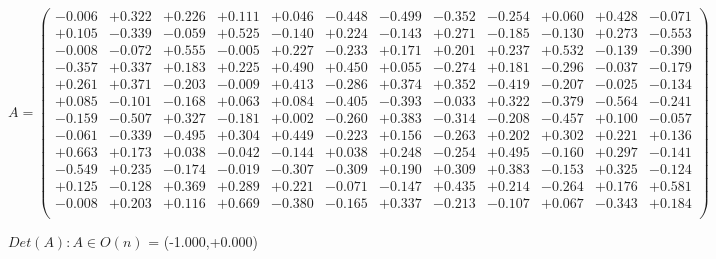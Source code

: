 \documentclass[9pt]{article}
\theoremstyle{plain}
\theoremstyle{definition}
\theoremstyle{remark}
\numberwithin{equation}{section}
\begin{document}
$A = \left(
\begin{array}{
cccccccccccc}
-0.006 & +0.322 & +0.226 & +0.111 & +0.046 & -0.448 & -0.499 & -0.352 & -0.254 & +0.060 & +0.428 & -0.071 \\
+0.105 & -0.339 & -0.059 & +0.525 & -0.140 & +0.224 & -0.143 & +0.271 & -0.185 & -0.130 & +0.273 & -0.553 \\
-0.008 & -0.072 & +0.555 & -0.005 & +0.227 & -0.233 & +0.171 & +0.201 & +0.237 & +0.532 & -0.139 & -0.390 \\
-0.357 & +0.337 & +0.183 & +0.225 & +0.490 & +0.450 & +0.055 & -0.274 & +0.181 & -0.296 & -0.037 & -0.179 \\
+0.261 & +0.371 & -0.203 & -0.009 & +0.413 & -0.286 & +0.374 & +0.352 & -0.419 & -0.207 & -0.025 & -0.134 \\
+0.085 & -0.101 & -0.168 & +0.063 & +0.084 & -0.405 & -0.393 & -0.033 & +0.322 & -0.379 & -0.564 & -0.241 \\
-0.159 & -0.507 & +0.327 & -0.181 & +0.002 & -0.260 & +0.383 & -0.314 & -0.208 & -0.457 & +0.100 & -0.057 \\
-0.061 & -0.339 & -0.495 & +0.304 & +0.449 & -0.223 & +0.156 & -0.263 & +0.202 & +0.302 & +0.221 & +0.136 \\
+0.663 & +0.173 & +0.038 & -0.042 & -0.144 & +0.038 & +0.248 & -0.254 & +0.495 & -0.160 & +0.297 & -0.141 \\
-0.549 & +0.235 & -0.174 & -0.019 & -0.307 & -0.309 & +0.190 & +0.309 & +0.383 & -0.153 & +0.325 & -0.124 \\
+0.125 & -0.128 & +0.369 & +0.289 & +0.221 & -0.071 & -0.147 & +0.435 & +0.214 & -0.264 & +0.176 & +0.581 \\
-0.008 & +0.203 & +0.116 & +0.669 & -0.380 & -0.165 & +0.337 & -0.213 & -0.107 & +0.067 & -0.343 & +0.184 \\
\end{array}
\right)$ \newline 

$Det(A) :   A \in O(n)$ = (-1.000,+0.000)
\end{document}
